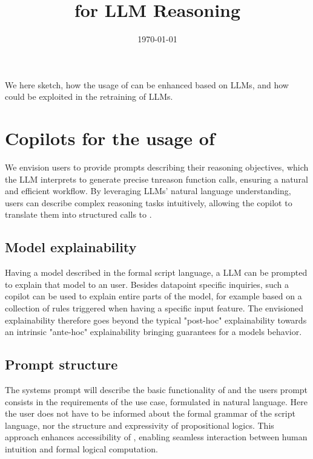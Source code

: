 \documentclass[aps,onecolumn,nofootinbib,pra]{article}
\begin{document}
\title{\tnreason for LLM Reasoning}

\maketitle
\date{\today}

We here sketch, how the usage of \tnreason can be enhanced based on LLMs, and how \tnreason could be exploited in the retraining of LLMs.

\section{Copilots for the usage of \tnreason}

We envision users to provide prompts describing their reasoning objectives, which the LLM interprets to generate precise tnreason function calls, ensuring a natural and efficient workflow.
By leveraging LLMs' natural language understanding, users can describe complex reasoning tasks intuitively, allowing the copilot to translate them into structured calls to \tnreason. 

\subsection{Model explainability}

Having a \tnreason model described in the formal script language, a LLM can be prompted to explain that model to an user.
Besides datapoint specific inquiries, such a copilot can be used to explain entire parts of the model, for example based on a collection of rules triggered when having a specific input feature.
The envisioned explainability therefore goes beyond the typical "post-hoc" explainability towards an intrinsic "ante-hoc" explainability bringing guarantees for a models behavior.

\subsection{Prompt structure}

The systems prompt will describe the basic functionality of \tnreason and the users prompt consists in the requirements of the use case, formulated in natural language.
Here the user does not have to be informed about the formal grammar of the \tnreason script language, nor the structure and expressivity of propositional logics.
This approach enhances accessibility of \tnreason, enabling seamless interaction between human intuition and formal logical computation.
\end{document}
